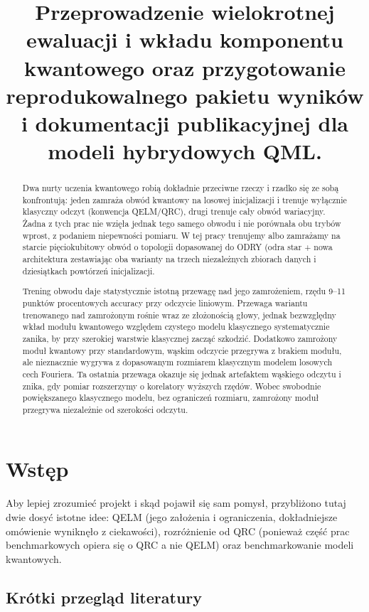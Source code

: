 \documentclass[11pt, a4paper]{article}
\title{Przeprowadzenie wielokrotnej ewaluacji i wkładu komponentu kwantowego oraz przygotowanie reprodukowalnego pakietu wyników i dokumentacji publikacyjnej dla modeli hybrydowych QML.}
\author{}
\date{}
\begin{document}
\maketitle
\newpage
\tableofcontents
\renewcommand{\abstractname}{Streszczenie}
\begin{abstract}
Dwa nurty uczenia kwantowego robią dokładnie przeciwne rzeczy i rzadko się ze sobą konfrontują: jeden zamraża obwód kwantowy na losowej inicjalizacji i trenuje wyłącznie klasyczny odczyt (konwencja QELM/QRC), drugi trenuje cały obwód wariacyjny. Żadna z tych prac nie wzięła jednak tego samego obwodu i nie porównała obu trybów wprost, z podaniem niepewności pomiaru. W tej pracy trenujemy albo zamrażamy na starcie pięciokubitowy obwód o topologii dopasowanej do ODRY (odra star + nowa architektura zestawiając oba warianty na trzech niezależnych zbiorach danych i dziesiątkach powtórzeń inicjalizacji.

Trening obwodu daje statystycznie istotną przewagę nad jego zamrożeniem, rzędu 9–11 punktów procentowych accuracy przy odczycie liniowym. Przewaga wariantu trenowanego nad zamrożonym rośnie wraz ze złożonością głowy, jednak bezwzględny wkład modułu kwantowego względem czystego modelu klasycznego systematycznie zanika, by przy szerokiej warstwie klasycznej zacząć szkodzić. Dodatkowo zamrożony moduł kwantowy przy standardowym, wąskim odczycie przegrywa z brakiem modułu, ale nieznacznie wygrywa z dopasowanym rozmiarem klasycznym modelem losowych cech Fouriera. Ta ostatnia przewaga okazuje się jednak artefaktem wąskiego odczytu i znika, gdy pomiar rozszerzymy o korelatory wyższych rzędów. Wobec swobodnie powiększanego klasycznego modelu, bez ograniczeń rozmiaru, zamrożony moduł przegrywa niezależnie od szerokości odczytu.
\end{abstract}

\section{Wstęp}
Aby lepiej zrozumieć projekt i skąd pojawił się sam pomysł, przybliżono tutaj dwie dosyć istotne idee: QELM (jego założenia i ograniczenia, dokładniejsze omówienie wyniknęło z ciekawości), rozróżnienie od QRC (ponieważ część prac benchmarkowych opiera się o QRC a nie QELM) oraz benchmarkowanie modeli kwantowych.

\subsection{Krótki przegląd literatury}
\end{document}
